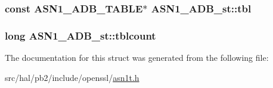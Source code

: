 \subsubsection[{\texorpdfstring{tbl}{tbl}}]{\setlength{\rightskip}{0pt plus 5cm}const {\bf A\+S\+N1\+\_\+\+A\+D\+B\+\_\+\+T\+A\+B\+LE}$\ast$ A\+S\+N1\+\_\+\+A\+D\+B\+\_\+st\+::tbl}\hypertarget{struct_a_s_n1___a_d_b__st_a82869e99ac7536c3368719f3dc2be71c}{}\label{struct_a_s_n1___a_d_b__st_a82869e99ac7536c3368719f3dc2be71c}
\subsubsection[{\texorpdfstring{tblcount}{tblcount}}]{\setlength{\rightskip}{0pt plus 5cm}long A\+S\+N1\+\_\+\+A\+D\+B\+\_\+st\+::tblcount}\hypertarget{struct_a_s_n1___a_d_b__st_a329d8b9d61abbc5fed3507e68f21c656}{}\label{struct_a_s_n1___a_d_b__st_a329d8b9d61abbc5fed3507e68f21c656}


The documentation for this struct was generated from the following file\+:\begin{DoxyCompactItemize}
\item 
src/hal/pb2/include/openssl/\hyperlink{asn1t_8h}{asn1t.\+h}\end{DoxyCompactItemize}
